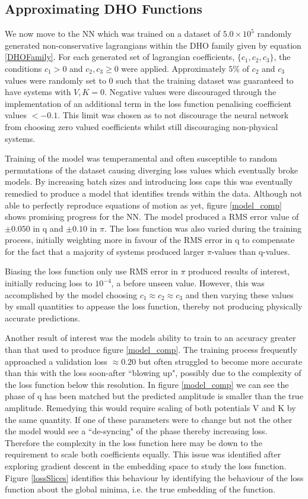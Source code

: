 \documentclass[10pt]{iopart}
\begin{document}
\subsection{Approximating DHO Functions}
We now move to the NN which was trained on a dataset of $5.0\times10^5$ randomly generated non-conservative lagrangians within the DHO family given by equation \ref{DHOFamily}. For each generated set of lagrangian coefficients, $\{c_1,c_2,c_3\}$, the conditions $c_1 > 0$ and $c_2,c_3 \geq 0$ were applied. Approximately $5\%$ of $c_2$ and $c_3$ values were randomly set to 0 such that the training dataset was guaranteed to have systems with $V,K = 0$. Negative values were discouraged through the implementation of an additional term in the loss function penalising coefficient values $ < -0.1$. This limit was chosen as to not discourage the neural network from choosing zero valued coefficients whilst still discouraging non-physical systems. 

Training of the model was temperamental and often susceptible to random permutations of the dataset causing diverging loss values which eventually broke models. By increasing batch sizes and introducing loss caps this was eventually remedied to produce a model that identifies trends within the data. Although not able to perfectly reproduce equations of motion as yet, figure \ref{model_comp} shows promising progress for the NN. The model produced a RMS error value of $\pm0.050$ in q and $\pm0.10$ in $\pi$. The loss function was also varied during the training process, initially weighting more in favour of the RMS error in q to compensate for the fact that a majority of systems produced larger $\pi$-values than q-values. 

Biasing the loss function only use RMS error in $\pi$ produced results of interest, initially reducing loss to $10^{-4}$, a before unseen value. However, this was accomplished by the model choosing $c_1\approx c_2\approx c_3$ and then varying these values by small quantities to appease the loss function, thereby not producing physically accurate predictions. 

Another result of interest was the models ability to train to an accuracy greater than that used to produce figure \ref{model_comp}. The training process frequently approached a validation loss $\approx 0.20$ but often struggled to become more accurate than this with the loss soon-after ``blowing up", possibly due to the complexity of the loss function below this resolution. In figure \ref{model_comp} we can see the phase of q has been matched but the predicted amplitude is smaller than the true amplitude. Remedying this would require scaling of both potentials V and K by the same quantity. If one of these parameters were to change but not the other the model would see a ``de-syncing" of the phase thereby increasing loss. Therefore the complexity in the loss function here may be down to the requirement to scale both coefficients equally. This issue was identified after exploring gradient descent in the embedding space to study the loss function. Figure \ref{lossSlices} identifies this behaviour by identifying the behaviour of the loss function about the global minima, i.e. the true embedding of the function.
\end{document}
